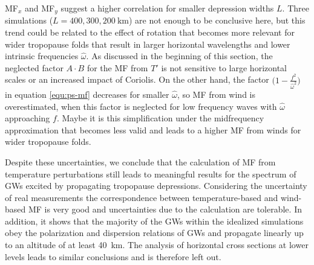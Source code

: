 MF$_x$ and MF$_y$ suggest a higher correlation for smaller depression widths $L$. Three simulations ($L=400,300,\SI{200}{\kilo\meter}$) are not enough to be conclusive here, but this trend could be related to the effect of rotation that becomes more relevant for wider tropopause folds that result in larger horizontal wavelengths and lower intrinsic frequencies $\hat{\omega}$. As discussed in the beginning of this section, the neglected factor $A \cdot B$ for the MF from $T'$ is not sensitive to large horizontal scales or an increased impact of Coriolis. On the other hand, the factor $\bigl(1-\frac{f^2}{\hat{\omega}^2}\bigr)$ in equation \ref{equ:ps-mf} decreases for smaller $\hat{\omega}$, so MF from wind is overestimated, when this factor is neglected for low frequency waves with $\hat{\omega}$ approaching $f$. Maybe it is this simplification under the midfrequency approximation that becomes less valid and leads to a higher MF from winds for wider tropopause folds.

Despite these uncertainties, we conclude that the calculation of MF from temperature perturbations still leads to meaningful results for the spectrum of GWs excited by propagating tropopause depressions. Considering the uncertainty of real measurements the correspondence between temperature-based and wind-based MF is very good and uncertainties due to the calculation are tolerable. In addition, it shows that the majority of the GWs within the idealized simulations obey the polarization and dispersion relations of GWs and propagate linearly up to an altitude of at least \SI{40}{\kilo\meter}. The analysis of horizontal cross sections at lower levels leads to similar conclusions and is therefore left out.



 
